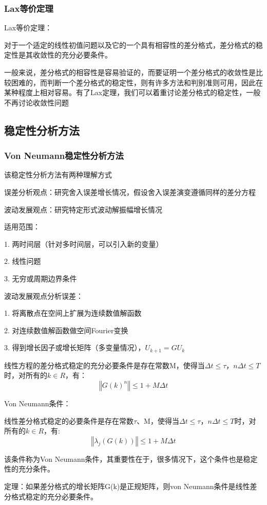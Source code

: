 \documentclass{article}
\begin{document}
\subsubsection{Lax等价定理}
Lax等价定理：

对于一个适定的线性初值问题以及它的一个具有相容性的差分格式，差分格式的稳定性是其收敛性的充分必要条件。

一般来说，差分格式的相容性是容易验证的，而要证明一个差分格式的收敛性是比较困难的，而判断一个差分格式的稳定性，则有许多方法和判别准则可用，因此在某种程度上相对容易。有了Lax定理，我们可以着重讨论差分格式的稳定性，一般不再讨论收敛性问题

\subsection{稳定性分析方法}

\subsubsection{Von Neumann稳定性分析方法}
该稳定性分析方法有两种理解方式

误差分析观点：研究舍入误差增长情况，假设舍入误差演变遵循同样的差分方程

波动发展观点：研究特定形式波动解振幅增长情况

适用范围：

1. 两时间层（针对多时间层，可以引入新的变量）

2. 线性问题

3. 无穷或周期边界条件

波动发展观点分析误差：

1. 将离散点在空间上扩展为连续数值解函数

2. 对连续数值解函数做空间Fourier变换

3. 得到增长因子或增长矩阵（多变量情况），$U_{k+1} = GU_{k}$

线性方程的差分格式稳定的充分必要条件是存在常数M，使得当$\Delta t\le τ，n\Delta t\le T$时，对所有的$k\in R$，有：
$$‖G(k)^n‖\le1+M\Delta t$$

Von Neumann条件：

线性差分格式稳定的必要条件是存在常数$\tau$、M，使得当$\Delta t\le \tau，n\Delta t\le T$时，对所有的$k\in R$，有:
$$‖\lambda_j(G(k))‖\le1+M\Delta t$$

该条件称为Von Neumann条件，其重要性在于，很多情况下，这个条件也是稳定性的充分条件。

定理：如果差分格式的增长矩阵G(k)是正规矩阵，则von Neumann条件是线性差分格式稳定的充分必要条件。
\end{document}
